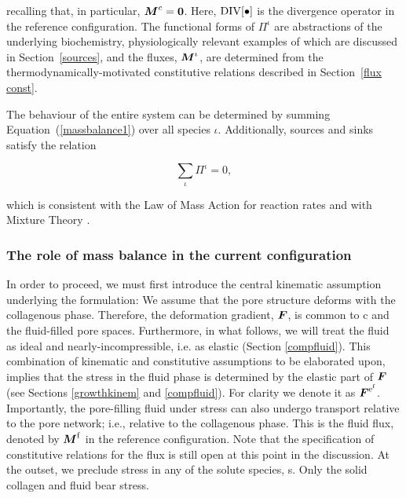 \noindent recalling that, in particular, $\mbox{\boldmath$ M$}^{c} = {\bf 0}$. Here,
$\mathrm{\small{DIV}[\bullet]}$ is the divergence 
operator in the reference configuration. The functional forms of
$\Pi^\iota$ are abstractions of the underlying biochemistry,
physiologically relevant examples of which are discussed in
Section~\ref{sources}, and the fluxes, $\mbox{\boldmath$ M$}^\iota$, are determined
from the thermodynamically-motivated constitutive relations described
in Section~\ref{flux const}.

The behaviour of the entire system can be determined by summing
\mbox{Equation~(\ref{massbalance1})} over all species $\iota$.
Additionally, sources and sinks satisfy the relation

\begin{equation}
\sum\limits_\iota\Pi^\iota = 0, \label{sourcebalance}
\end{equation}

\noindent which is consistent \citep{growthpaper} with the Law of Mass
Action for reaction rates and with Mixture Theory
\citep{TruesdellNoll:65}.

\subsubsection{The role of mass balance in the current
configuration}\label{curr-ref-mb}



In order to proceed, we must first introduce the central kinematic
assumption underlying the 
formulation: We assume that the pore structure deforms with the
collagenous phase. Therefore, the deformation gradient, $\mbox{\boldmath$ F$}$, is
common to c and the fluid-filled pore spaces. Furthermore, in what
follows, we will treat the fluid as ideal and nearly-incompressible,
i.e. as elastic (Section \ref{compfluid}). This combination of
kinematic and constitutive assumptions to be elaborated upon, implies
that the stress in the fluid phase is determined by the elastic part of
$\mbox{\boldmath$ F$}$ (see Sections \ref{growthkinem} and
\ref{compfluid}). For clarity we denote it as
$\mbox{\boldmath$ F$}^{\mathrm{e}^\mathrm{f}}$. Importantly, the pore-filling fluid under stress
can also undergo transport relative to the pore network; i.e.,
relative to the collagenous phase. This is the fluid flux, denoted by
$\mbox{\boldmath$ M$}^\mathrm{f}$ in the reference configuration. Note that the
specification of constitutive relations for the flux is still open at
this point in the discussion. At the outset, we preclude stress in any
of the solute species, s. Only the solid collagen and fluid bear
stress. 


